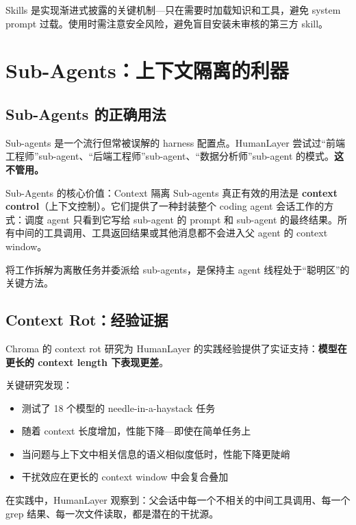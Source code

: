 \documentclass[a4paper]{article}
\begin{document}
Skills 是实现渐进式披露的关键机制---只在需要时加载知识和工具，避免 system prompt 过载。使用时需注意安全风险，避免盲目安装未审核的第三方 skill。


\section{Sub-Agents：上下文隔离的利器}

\subsection{Sub-Agents 的正确用法}

Sub-agents 是一个流行但常被误解的 harness 配置点。HumanLayer 尝试过``前端工程师''sub-agent、``后端工程师''sub-agent、``数据分析师''sub-agent 的模式。\textbf{这不管用。}

\begin{importantbox}{Sub-Agents 的核心价值：Context 隔离}
Sub-agents 真正有效的用法是 \textbf{context control}（上下文控制）。它们提供了一种封装整个 coding agent 会话工作的方式：调度 agent 只看到它写给 sub-agent 的 prompt 和 sub-agent 的最终结果。所有中间的工具调用、工具返回结果或其他消息都不会进入父 agent 的 context window。

将工作拆解为离散任务并委派给 sub-agents，是保持主 agent 线程处于``聪明区''的关键方法。
\end{importantbox}

\subsection{Context Rot：经验证据}

Chroma 的 context rot 研究为 HumanLayer 的实践经验提供了实证支持：\textbf{模型在更长的 context length 下表现更差}。

关键研究发现：
\begin{itemize}[leftmargin=1.5em]
    \item 测试了 18 个模型的 needle-in-a-haystack 任务
    \item 随着 context 长度增加，性能下降---即使在简单任务上
    \item 当问题与上下文中相关信息的语义相似度低时，性能下降更陡峭
    \item 干扰效应在更长的 context window 中会复合叠加
\end{itemize}

在实践中，HumanLayer 观察到：父会话中每一个不相关的中间工具调用、每一个 grep 结果、每一次文件读取，都是潜在的干扰源。
\end{document}
